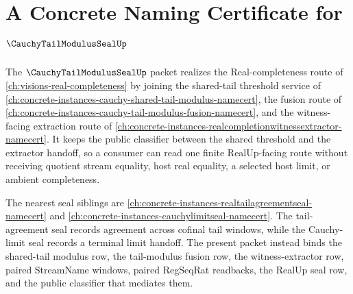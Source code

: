 \chapter{A Concrete Naming Certificate for $\CauchyTailModulusSealUp$}
\label{ch:concrete-instances-cauchy-tail-modulus-seal-namecert}

The $\CauchyTailModulusSealUp$ packet realizes the Real-completeness route of \autoref{ch:visions-real-completeness} by joining the shared-tail threshold service of \autoref{ch:concrete-instances-cauchy-shared-tail-modulus-namecert}, the fusion route of \autoref{ch:concrete-instances-cauchy-tail-modulus-fusion-namecert}, and the witness-facing extraction route of \autoref{ch:concrete-instances-realcompletionwitnessextractor-namecert}. It keeps the public classifier between the shared threshold and the extractor handoff, so a consumer can read one finite RealUp-facing route without receiving quotient stream equality, host real equality, a selected host limit, or ambient completeness.

The nearest seal siblings are \autoref{ch:concrete-instances-realtailagreementseal-namecert} and \autoref{ch:concrete-instances-cauchylimitseal-namecert}. The tail-agreement seal records agreement across cofinal tail windows, while the Cauchy-limit seal records a terminal limit handoff. The present packet instead binds the shared-tail modulus row, the tail-modulus fusion row, the witness-extractor row, paired StreamName windows, paired RegSeqRat readbacks, the RealUp seal row, and the public classifier that mediates them.



